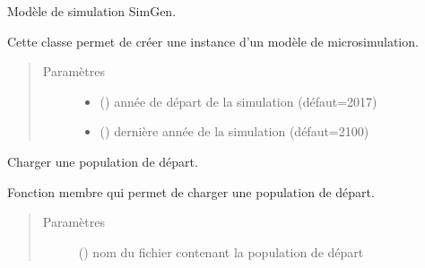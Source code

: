 \documentclass[letterpaper,10pt,french]{sphinxmanual}
\begin{document}
\begin{fulllineitems}
\label{\detokenize{utilisation:id0}}
Modèle de simulation SimGen.

Cette classe permet de créer une instance d’un modèle de microsimulation.
\begin{quote}\begin{description}
\item[{Paramètres}] \leavevmode\begin{itemize}
\item {} 
 () \textendash{} année de départ de la simulation (défaut=2017)

\item {} 
 () \textendash{} dernière année de la simulation (défaut=2100)

\end{itemize}

\end{description}\end{quote}

\begin{fulllineitems}
\label{\detokenize{utilisation:simgen.model.startpop}}
Charger une population de départ.

Fonction membre qui permet de charger une population de départ.
\begin{quote}\begin{description}
\item[{Paramètres}] \leavevmode
{} () \textendash{} nom du fichier contenant la population de départ

\end{description}\end{quote}

\end{fulllineitems}


\end{fulllineitems}
\end{document}

